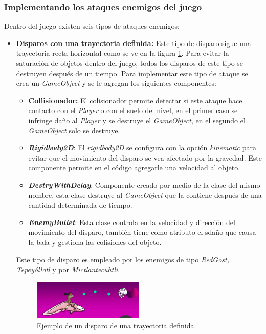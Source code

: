 \subsubsection{Implementando los ataques enemigos del juego}
Dentro del juego existen seis tipos de ataques enemigos:
	\begin{itemize}
		\item \textbf{Disparos con una trayectoria definida:} Este tipo de 
		disparo sigue una trayectoria recta horizontal como se ve en la figura 		
		\ref{fig:Enemyshot}. 
		Para evitar la saturación de objetos dentro del juego, todos los disparos de 
		este tipo se destruyen después de un tiempo. Para implementar este tipo de 
		ataque se crea un \textit{GameObject} y se le agregan los siguientes 
		componentes: 
			\begin{itemize}
				\item \textbf{Collisionador:} El colisionador permite detectar si este 
				ataque hace contacto con el \textit{Player} o con el suelo del nivel, 
				en el primer caso se infringe daño al \textit{Player} y se destruye el 
				\textit{GameObject}, en el segundo el \textit{GameObject} solo se 
				destruye. 
				\item \textbf{\textit{Rigidbody2D}}: El \textit{rigidbody2D} se 
				configura 
				con la opción \textit{kinematic} para evitar que el movimiento del 
				disparo se vea afectado por la gravedad. Este componente permite en el 
				código agregarle una velocidad al objeto.
				\item \textbf{\textit{DestryWithDelay}}: Componente creado por medio de 
				la clase del mismo nombre, esta clase destruye al \textit{GameObject} 
				que la contiene después de una cantidad determinada de tiempo.
				\item \textbf{\textit{EnemyBullet}}: Esta clase controla en la velocidad 
				y dirección del movimiento del disparo, también tiene como atributo el 
				sdaño que causa la bala y gestiona las colisiones del objeto.
			\end{itemize}
		Este tipo de disparo es empleado por los enemigos de tipo \textit{RedGost, 
		Tepeyóllotl} y por \textit{Mictlantecuhtli}.
			
			\begin{figure}[h]
    			\centering
    			\includegraphics[width=0.5\textwidth]{03TrabajoRealizado/imagenes/disparoTrayectoria.png}
    			\caption{Ejemplo de un disparo de una trayectoria definida.}
    			\label{fig:Enemyshot}
			\end{figure}
			

\end{itemize}
